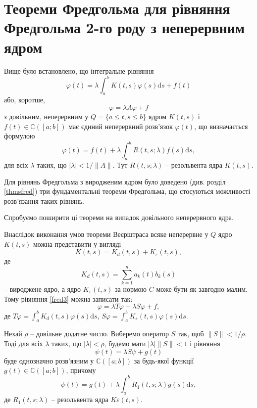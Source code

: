 \documentclass[14pt,twoside]{extreport}
\theoremstyle{mystyle}
\numberwithin{equation}{chapter}
\newcommand{\cab}{\mathbb{C}([a; b])}
\begin{document}
\chapter{Теореми Фредгольма для рівняння Фредгольма 2-го роду з неперервним ядром}\label{fredgeneral}

Вище було встановлено, що інтегральне рівняння
\begin{equation}\label{fred3}
\varphi(t)=\lambda\int_{a}^{b} K(t,s) \varphi(s)\mathrm{d}s + f(t)
\end{equation}
або, коротше,
\[
\varphi = \lambda A \varphi + f
\]
з довільним, неперервним у $Q=\{a \leqslant t, s \leqslant b\}$ ядром $K(t, s)$ і $f(t) \in \cab$ має єдиний неперервний розв'язок $\varphi(t)$, що визначається формулою
\begin{equation}\label{resfr2}
\displaystyle \varphi(t)=f(t)+\lambda\int_{a}^{b}R(t, s;\lambda)f(s)\mathrm{d}s,
\end{equation}
для всіх $\lambda$ таких, що $|\lambda| < 1/ \|A\|$. Тут $R(t, s; \lambda)$ -- резольвента ядра $K(t, s)$.

Для рівнянь Фредгольма з виродженим ядром було доведено (див. розділ \ref{thmsfred}) три фундаментальні теореми Фредгольма, що стосуються можливості розв'язання таких рівнянь.

Спробуємо поширити ці теореми на випадок довільного неперервного ядра.

Внаслідок виконання умов теореми Веєрштраса всяке неперервне у $Q$ ядро $K(t, s)$ можна представити у вигляді
\[
K(t, s) = K_d(t, s) + K_\varepsilon (t, s),
\]
де
\[
K_d(t, s) = \sum_{k=1}^{n} a_k(t) b_k(s)
\]
-- вироджене ядро, а ядро $K_\varepsilon(t, s)$ за нормою $C$ може бути як завгодно малим. Тому рівняння \eqref{fred3} можна записати так:
\begin{equation}\label{opexpfred}
\varphi = \lambda T \varphi + \lambda S\varphi + f,
\end{equation}
де $\displaystyle T\varphi = \int_{a}^{b} K_d(t,s) \varphi(s)\mathrm{d}s$, $\displaystyle S\varphi = \int_{a}^{b} K_\varepsilon (t,s) \varphi(s)\mathrm{d}s$.

Нехай $\rho$ -- довільне додатне число. Виберемо оператор $S$ так, щоб $\|S\|< 1/\rho$. Тоді для всіх $\lambda$ таких, що $|\lambda| < \rho$, будемо мати $|\lambda| \|S\| < 1$ і рівняння
\[
\psi(t) = \lambda S \psi + g(t)
\]
буде однозначно розв'язним у $\cab$ за будь-якої функції $g(t) \in \cab$, причому
\begin{equation}\label{psieq}
\psi(t) = g(t) + \lambda \int_{a}^{b} R_1 (t, s; \lambda) g(s) \mathrm{d}s,
\end{equation}
де $R_1(t, s; \lambda)$ -- резольвента ядра $K\varepsilon(t, s)$.
\end{document}
